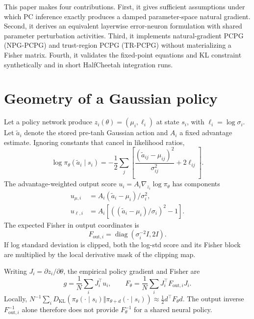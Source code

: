 \documentclass{article}
\newcommand{\KL}{D_{\mathrm{KL}}}
\newcommand{\Fouti}{F_{\mathrm{out},i}}
\newcommand{\Fpol}{F_{\theta}}
\begin{document}
This paper makes four contributions. First, it gives sufficient assumptions under which PC inference exactly produces a damped parameter-space natural gradient. Second, it derives an equivalent layerwise error-neuron formulation with shared parameter perturbation activities. Third, it implements natural-gradient PCPG (NPG-PCPG) and trust-region PCPG (TR-PCPG) without materializing a Fisher matrix. Fourth, it validates the fixed-point equations and KL constraint synthetically and in short HalfCheetah integration runs.

\section{Geometry of a Gaussian policy}

Let a policy network produce $z_i(\theta)=(\mu_i,\ell_i)$ at state $s_i$, with $\ell_i=\log\sigma_i$. Let $\tilde a_i$ denote the stored pre-tanh Gaussian action and $A_i$ a fixed advantage estimate. Ignoring constants that cancel in likelihood ratios,
\begin{equation}
\log\pi_\theta(\tilde a_i\mid s_i)
=-\frac12\sum_j\left[\frac{(\tilde a_{ij}-\mu_{ij})^2}{\sigma_{ij}^2}+2\ell_{ij}\right].
\label{eq:logprob}
\end{equation}
The advantage-weighted output score $u_i=A_i\nabla_{z_i}\log\pi_\theta$ has components
\begin{align}
u_{\mu,i}&=A_i(\tilde a_i-\mu_i)/\sigma_i^2, \\
u_{\ell,i}&=A_i\left[((\tilde a_i-\mu_i)/\sigma_i)^2-1\right].
\end{align}
The expected Fisher in output coordinates is
\begin{equation}
\Fouti=\operatorname{diag}(\sigma_i^{-2}I,2I).
\label{eq:fout}
\end{equation}
If log standard deviation is clipped, both the log-std score and its Fisher block are multiplied by the local derivative mask of the clipping map.

Writing $J_i=\partial z_i/\partial\theta$, the empirical policy gradient and Fisher are
\begin{equation}
g=\frac1N\sum_iJ_i^\top u_i,
\qquad
\Fpol=\frac1N\sum_iJ_i^\top\Fouti J_i.
\label{eq:gfisher}
\end{equation}
Locally, $N^{-1}\sum_i\KL(\pi_\theta(\cdot\mid s_i)\Vert\pi_{\theta+d}(\cdot\mid s_i))\approx\frac12d^\top\Fpol d$. The output inverse $\Fouti^{-1}$ alone therefore does not provide $\Fpol^{-1}$ for a shared neural policy.
\end{document}
